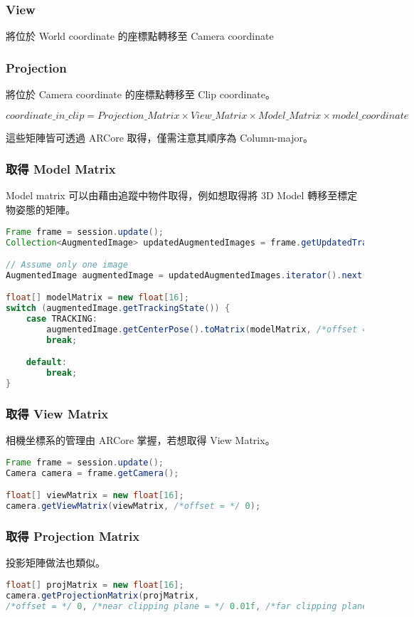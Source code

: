 \subsubsection{View}
將位於 World coordinate 的座標點轉移至 Camera coordinate

\subsubsection{Projection}
將位於 Camera coordinate 的座標點轉移至 Clip coordinate。

\begin{center}
    $
        coordinate\_in\_clip = Projection\_Matrix \times View\_Matrix \times Model\_Matrix \times model\_coordinate
    $
\end{center}

這些矩陣皆可透過 ARCore 取得，僅需注意其順序為 Column-major。

\subsubsection{取得 Model Matrix}

Model matrix 可以由藉由追蹤中物件取得，例如想取得將 3D Model 轉移至標定物姿態的矩陣。

\begin{lstlisting}[language=Java, caption=將 3D model 的座標空間轉移至以標定物為準的空間]
Frame frame = session.update();
Collection<AugmentedImage> updatedAugmentedImages = frame.getUpdatedTrackables(AugmentedImage.class);

// Assume only one image
AugmentedImage augmentedImage = updatedAugmentedImages.iterator().next();

float[] modelMatrix = new float[16];
switch (augmentedImage.getTrackingState()) {
    case TRACKING:
        augmentedImage.getCenterPose().toMatrix(modelMatrix, /*offset = */ 0);
        break;

    default:
        break;
}
\end{lstlisting}

\subsubsection{取得 View Matrix}

相機坐標系的管理由 ARCore 掌握，若想取得 View Matrix。

\begin{lstlisting}[language=Java, caption=取得 View Matrix]
Frame frame = session.update();
Camera camera = frame.getCamera();

float[] viewMatrix = new float[16];
camera.getViewMatrix(viewMatrix, /*offset = */ 0);
\end{lstlisting}

\subsubsection{取得 Projection Matrix}

投影矩陣做法也類似。

\begin{lstlisting}[language=Java, caption=取得 Projection Matrix]
float[] projMatrix = new float[16];
camera.getProjectionMatrix(projMatrix,
/*offset = */ 0, /*near clipping plane = */ 0.01f, /*far clipping plane = */ 15.0f);
\end{lstlisting}
